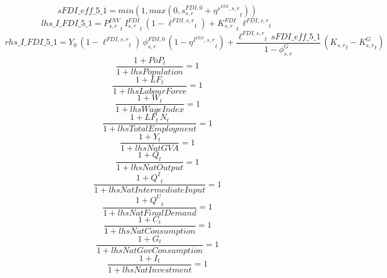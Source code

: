 \begin{dmath*}
sFDI\_eff\_5\_1 = min(1,max(0,{{s^{FDI,0}_{s,r}}}+{{\eta^{s^{FDI},s,r}}}_{t}))
\end{dmath*}
\begin{dmath*}
lhs\_I\_FDI\_5\_1 = {{P^{INV}_{s,r}}}_{t}\, {{I^{FDI}_{s,r}}}_{t}\, \left(1-{{\ell^{FDI,s,r}}}_{t}\right)+{{K^{FDI}_{s,r}}}_{t}\, {{\ell^{FDI,s,r}}}_{t}
\end{dmath*}
\begin{dmath*}
rhs\_I\_FDI\_5\_1 = {{Y_0}}\, \left(1-{{\ell^{FDI,s,r}}}_{t}\right)\, {{\phi^{FDI,0}_{s,r}}}\, \left(1-{{\eta^{I^{FDI},s,r}}}_{t}\right)+\frac{{{\ell^{FDI,s,r}}}_{t}\, {sFDI\_eff\_5\_1}}{1-{{\phi^{G}_{s,r}}}}\, \left({{K_{s,r}}}_{t}-{{K^G_{s,r}}}_{t}\right)
\end{dmath*}
\begin{dmath}
\frac{1+{PoP}_{t}}{1+{lhsPopulation}}=1
\end{dmath}
\begin{dmath}
\frac{1+{LF}_{t}}{1+{lhsLabourForce}}=1
\end{dmath}
\begin{dmath}
\frac{1+{W}_{t}}{1+{lhsWageIndex}}=1
\end{dmath}
\begin{dmath}
\frac{1+{LF}_{t}\, {N}_{t}}{1+{lhsTotalEmployment}}=1
\end{dmath}
\begin{dmath}
\frac{1+{Y}_{t}}{1+{lhsNatGVA}}=1
\end{dmath}
\begin{dmath}
\frac{1+{Q}_{t}}{1+{lhsNatOutput}}=1
\end{dmath}
\begin{dmath}
\frac{1+{Q^{I}}_{t}}{1+{lhsNatIntermediateInput}}=1
\end{dmath}
\begin{dmath}
\frac{1+{Q^{U}}_{t}}{1+{lhsNatFinalDemand}}=1
\end{dmath}
\begin{dmath}
\frac{1+{C}_{t}}{1+{lhsNatConsumption}}=1
\end{dmath}
\begin{dmath}
\frac{1+{G}_{t}}{1+{lhsNatGovConsumption}}=1
\end{dmath}
\begin{dmath}
\frac{1+{I}_{t}}{1+{lhsNatInvestment}}=1
\end{dmath}
